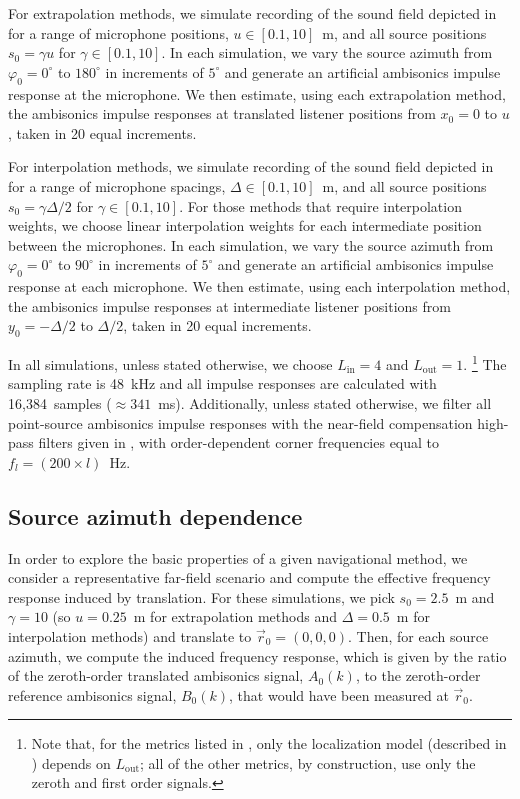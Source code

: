 For extrapolation methods, we simulate recording of the sound field depicted in  for a range of microphone positions, $u \in [0.1, 10]$~m, and all source positions $s_0 = \gamma u$ for $\gamma \in [0.1, 10]$.
In each simulation, we vary the source azimuth from $\varphi_0 = 0^\circ$ to $180^\circ$ in increments of $5^\circ$ and generate an artificial ambisonics impulse response at the microphone.
We then estimate, using each extrapolation method, the ambisonics impulse responses at translated listener positions from $x_0 = 0$ to $u$, taken in 20 equal increments.

For interpolation methods, we simulate recording of the sound field depicted in  for a range of microphone spacings, $\Delta \in [0.1, 10]$~m, and all source positions $s_0 = \gamma \Delta / 2$ for $\gamma \in [0.1, 10]$.
For those methods that require interpolation weights, we choose linear interpolation weights for each intermediate position between the microphones.
In each simulation, we vary the source azimuth from $\varphi_0 = 0^\circ$ to $90^\circ$ in increments of $5^\circ$ and generate an artificial ambisonics impulse response at each microphone.
We then estimate, using each interpolation method, the ambisonics impulse responses at intermediate listener positions from $y_0 = -\Delta/2$ to $\Delta/2$, taken in 20 equal increments.

In all simulations, unless stated otherwise, we choose $L_\textrm{in} = 4$ and $L_\textrm{out} = 1$.%
\footnote{Note that, for the metrics listed in , only the localization model (described in ) depends on $L_\textrm{out}$; all of the other metrics, by construction, use only the zeroth and first order signals.}
The sampling rate is 48~kHz and all impulse responses are calculated with 16,384~samples ($\approx 341$~ms).
Additionally, unless stated otherwise, we filter all point-source ambisonics impulse responses with the near-field compensation high-pass filters given in , with order-dependent corner frequencies equal to $f_l = (200 \times l)$~Hz.

\subsection{Source azimuth dependence}\label{sec:06_Simulation_Framework:Azimuth_Dependence}
In order to explore the basic properties of a given navigational method, we consider a representative far-field scenario and compute the effective frequency response induced by translation.
For these simulations, we pick $s_0 = 2.5$~m and $\gamma = 10$ (so $u = 0.25$~m for extrapolation methods and $\Delta = 0.5$~m for interpolation methods) and translate to $\vec{r}_0 = (0, 0, 0)$.
Then, for each source azimuth, we compute the induced frequency response, which is given by the ratio of the zeroth-order translated ambisonics signal, $A_0(k)$, to the zeroth-order reference ambisonics signal, $B_0(k)$, that would have been measured at $\vec{r}_0$.